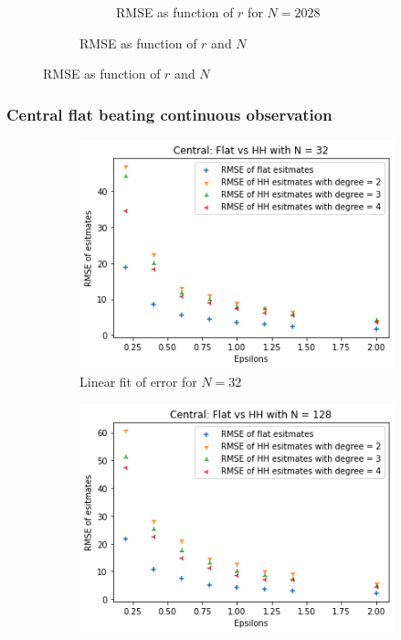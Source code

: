 \documentclass[11pt]{article}
\theoremstyle{definition}
\begin{document}
\begin{figure}[H]
\begin{subfigure}{.4\textwidth}
\begin{subfigure}{\textwidth}
  \caption{RMSE as function of $r$ for $N=2028$}
  \label{fig:33}
\end{subfigure}
\caption{RMSE as function of $r$ and $N$}
\label{fig:b}
\end{subfigure}
\caption{RMSE as function of $r$ and $N$}
\label{fig:34}
\end{figure}

\subsubsection{Central flat beating continuous observation}\label{app:cen_flat_over}
\begin{figure}[H]
\centering
\begin{subfigure}{.4\textwidth}
  \centering
  \includegraphics[width=\linewidth]{figures/central_flat_hh/flat_beat_hh_N=32.png}
  \caption{Linear fit of error for $N=32$}
  \label{fig:35}
\end{subfigure}%
\begin{subfigure}{.4\textwidth}
  \centering
  \includegraphics[width=\linewidth]{figures/central_flat_hh/flat_beat_hh_N=128.png}

\end{subfigure}
\end{figure}
\end{document}
